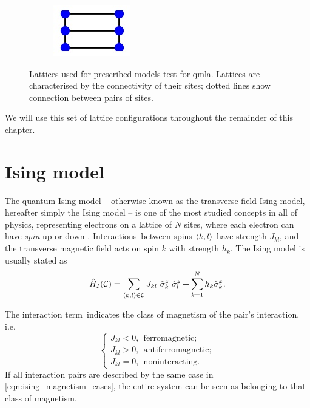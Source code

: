 \begin{figure}
\begin{center}
\begin{subfigure}{2.25cm}
            \caption{}
        \end{subfigure}
        \qquad
        \begin{subfigure}{2cm} 
            \includegraphics{theoretical_study/figures/lattices/_6_site_grid.jpg}        
            \caption{}
        \end{subfigure}
    \end{center}
    \caption[Lattices for prescribed QMLA exploration strategy]{
        Lattices used for prescribed models test for \gls{qmla}.
        Lattices are characterised by the connectivity of their sites; 
            dotted lines show connection between pairs of sites.                 
    }
    \label{fig:lattices}
\end{figure}

We will use this set of lattice configurations throughout the remainder of this chapter. 

\section{Ising model}\label{sec:ising}
The quantum Ising model -- otherwise known as the transverse field Ising model, hereafter simply the Ising model -- 
    is one of the most studied concepts in all of physics, 
    representing electrons on a lattice of $N$ sites, 
    where each electron can have \emph{spin} up or down 
    \cite{ising1925beitrag, onsager1944crystal, brush1967history}.
Interactions\footnotemark \ between spins ${ \langle k, l \rangle }$ have strength $J_{kl}$, 
    and the transverse magnetic field acts on spin $k$ with strength $h_k$. 
The Ising model is usually stated as 
\begin{equation}
    \label{eqn:ising_standard_form}
    \hat{H}_I(\cc) = \sum_{\bkl \in \mathcal{C}} J_{kl}  \ \hat{\sigma}_k^z \ \hat{\sigma}_{l}^z + \sum_{k=1}^{N} h_k \hat{\sigma}_{k}^x.
\end{equation}

The interaction term\footnotemark \ indicates the class of magnetism of the pair's interaction, i.e. 
\begin{equation}
    \label{eqn:ising_magnetism_cases}
    \begin{cases}
        J_{kl} < 0, \ \ \textrm{ferromagnetic}; \\
        J_{kl} > 0, \ \ \textrm{antiferromagnetic}; \\
        J_{kl} = 0, \ \ \textrm{noninteracting}.
    \end{cases}
\end{equation}
If all interaction pairs are described by the same case in \cref{eqn:ising_magnetism_cases}, 
    the entire system can be seen as belonging to that class of magnetism. 

